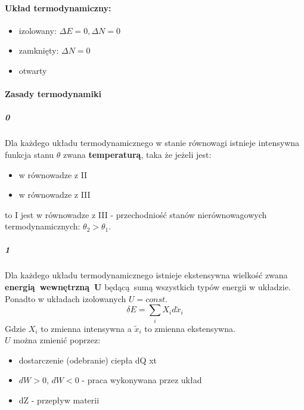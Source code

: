 \documentclass{article}
\begin{document}
		\paragraph{Układ termodynamiczny:}
			\begin{itemize}
				\item izolowany: $\Delta E = 0, \Delta N = 0$
				\item zamknięty: $\Delta N = 0$
				\item otwarty
			\end{itemize}
		\paragraph{Zasady termodynamiki}
			\subparagraph{0} Dla każdego układu termodynamicznego w stanie równowagi istnieje intensywna funkcja stanu $\theta$ zwana \textbf{temperaturą}, taka że jeżeli jest:
				\begin{itemize}
					\item w równowadze z II
					\item w równowadze z III
				\end{itemize}
			to I jest w równowadze z III - przechodniość stanów nierównowagowych termodynamicznych: $\theta_2 > \theta_1$.
			\subparagraph{1} Dla każdego układu termodynamicznego istnieje ekstensywna wielkość zwana \textbf{energią wewnętrzną U} będącą sumą wszystkich typów energii w układzie. Ponadto w układach izolowanych $U = const$.
			$$\delta E = \sum_i X_id \tilde{x}_i$$
			Gdzie $X_i$ to zmienna intensywna a $ \tilde{x}_i$ to zmienna ekstensywna. \\
			$U$ można zmienić poprzez:
				\begin{itemize}
					\item dostarczenie (odebranie) ciepła dQ xt	
					\item $dW > 0$, $dW < 0$ - praca wykonywana przez układ
					\item dZ  - przepływ materii
				\end{itemize}
\end{document}
